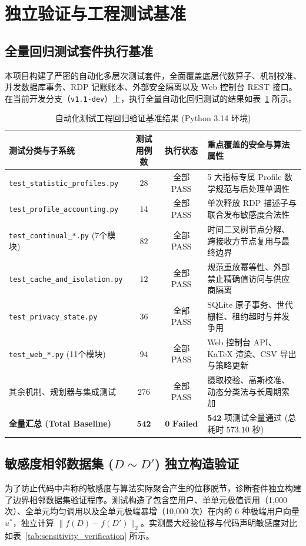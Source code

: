 \section{独立验证与工程测试基准}
\label{sec:validation}

\subsection{全量回归测试套件执行基准}
本项目构建了严密的自动化多层次测试套件，全面覆盖底层代数算子、机制校准、并发数据库事务、RDP 记账账本、外部安全隔离以及 Web 控制台 REST 接口。在当前开发分支（\texttt{v1.1-dev}）上，执行全量自动化回归测试的结果如表~\ref{tab:test_summary} 所示。

\begin{table}[htbp]
\centering
\small
\caption{自动化测试工程回归验证基准结果 (Python 3.14 环境)}
\label{tab:test_summary}
\begin{tabularx}{\textwidth}{lccX}
\toprule
\textbf{测试分类与子系统} & \textbf{测试用例数} & \textbf{执行状态} & \textbf{重点覆盖的安全与算法属性} \\
\midrule
\texttt{test\_statistic\_profiles.py} & $28$ & 全部 PASS & 5 大指标专属 Profile 数学规范与后处理单调性 \\
\texttt{test\_profile\_accounting.py} & $14$ & 全部 PASS & 单次释放 RDP 描述子与联合发布敏感度合法性 \\
\texttt{test\_continual\_*.py} (7个模块) & $82$ & 全部 PASS & 时间二叉树节点分解、跨接收方节点复用与最终边界 \\
\texttt{test\_cache\_and\_isolation.py} & $12$ & 全部 PASS & 规范重放幂等性、外部禁止精确值访问与供应商隔离 \\
\texttt{test\_privacy\_state.py} & $36$ & 全部 PASS & SQLite 原子事务、世代栅栏、租约超时与并发争用 \\
\texttt{test\_web\_*.py} (11个模块) & $94$ & 全部 PASS & Web 控制台 API、KaTeX 渲染、CSV 导出与策略更新 \\
其余机制、规划器与集成测试 & $276$ & 全部 PASS & 摄取校验、高斯校准、动态分类法与长周期累加 \\
\midrule
\textbf{全量汇总 (Total Baseline)} & $\mathbf{542}$ & $\mathbf{0\text{ Failed}}$ & $\mathbf{542\text{ 项测试全量通过}}$ (总耗时 $573.10\text{ 秒}$) \\
\bottomrule
\end{tabularx}
\end{table}

\subsection{敏感度相邻数据集 (\texorpdfstring{$D \sim D'$}{D ~ D'}) 独立构造验证}
为了防止代码中声称的敏感度与算法实际聚合产生的位移脱节，诊断套件独立构建了边界相邻数据集验证程序。测试构造了包含空用户、单单元极值调用（1,000 次）、全单元均匀调用以及全单元极端暴增（10,000 次）在内的 6 种极端用户向量 $u^*$，独立计算 $\|f(D) - f(D')\|_2$。实测最大经验位移与代码声明敏感度对比如表~\ref{tab:sensitivity_verification} 所示。


